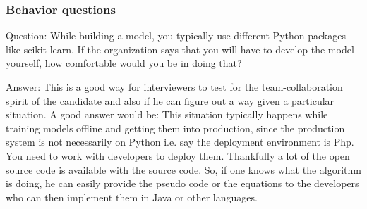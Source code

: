 \documentclass[11pt]{beamer}
\begin{document}
\begin{frame}
\frametitle{Behavior questions}
\begin{block}{Question:}
	While building a model, you typically use different Python packages like scikit-learn. If the organization says that you will have to develop the model yourself, how comfortable would you be in doing that?
\end{block}
\begin{block}{Answer:}
	This is a good way for interviewers to test for the team-collaboration spirit of the candidate and also if he can figure out a way given a particular situation. A good answer would be:
	This situation typically happens while training models offline and getting them into production, since the production system is not necessarily on Python i.e. say the deployment environment is Php. You need to work with developers to deploy them. Thankfully a lot of the open source code is available with the source code. 
	So, if one knows what the algorithm is doing, he can easily provide the pseudo code or the equations to the developers who can then implement them in Java or other languages.
\end{block}
\end{frame}
\end{document}

